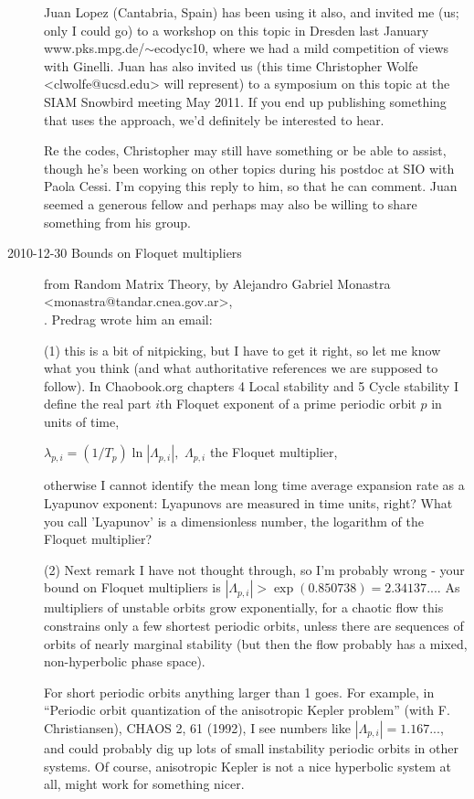 \begin{description}
Juan Lopez (Cantabria, Spain) has been using it also, and invited me (us;
only I could go) to a workshop on this topic in Dresden last January
{www.pks.mpg.de/$\sim$ecodyc10},
where we had a mild competition of views with Ginelli.   Juan has also
invited us (this time Christopher Wolfe <clwolfe@ucsd.edu> will
represent) to a symposium on this topic at the SIAM Snowbird meeting May
2011.  If you end up publishing something that uses the approach, we'd
definitely be interested to hear.

Re the codes, Christopher may still have something or be able to assist,
though he's been working on other topics during his postdoc at SIO with
Paola Cessi.  I'm copying this reply to him, so that he can comment.
Juan seemed a generous fellow and perhaps may also be willing to share
something from his group.

\item[2010-12-30 Bounds on Floquet multipliers]
from Random Matrix Theory,
by Alejandro Gabriel Monastra <monastra@tandar.cnea.gov.ar>,
\\
. Predrag
wrote him an email:

(1)
this is a bit of nitpicking, but I have to get it right, so let me know what you
think (and what authoritative references we are supposed to follow). In
Chaobook.org chapters
4 Local stability
and
5 Cycle stability
I define the real part $i$th Floquet exponent of a prime periodic orbit $p$
in units of time,

$ \lambda_{p,i} = (1/T_p) \ln |\Lambda_{p,i}| ,$
$\Lambda_{p,i}$ the Floquet multiplier,

otherwise I cannot identify the mean long time average expansion rate
as a Lyapunov exponent: Lyapunovs are measured in time units, right?
What you call 'Lyapunov' is a dimensionless number,
the logarithm of the Floquet multiplier?

(2)
Next remark I have not thought through, so I'm probably wrong - your bound
on Floquet multipliers is  $|\Lambda_{p,i}| > \exp(0.850738) =2.34137...$. As
multipliers of unstable orbits grow exponentially, for a chaotic flow this
constrains only a few shortest periodic orbits, unless there are sequences of
orbits of nearly marginal stability (but then the flow probably has a mixed,
non-hyperbolic phase space).

For short periodic orbits anything larger than 1 goes. For example, in
{``Periodic orbit quantization} of the anisotropic Kepler problem''
(with F. Christiansen), CHAOS 2, 61 (1992), I see numbers like
$|\Lambda_{p,i}| = 1.167...$, and could probably dig up lots of small
instability periodic orbits in other systems. Of course, anisotropic Kepler
is not a nice hyperbolic system at all, might work for something nicer.


\end{description}
